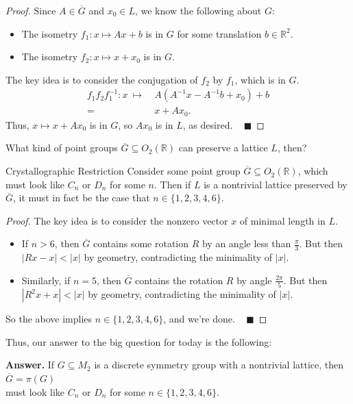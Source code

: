 \begin{proof}
    Since $A \in \overline{G}$ and $x_0 \in L$, we know the following about $G$:
    \begin{itemize}
        \item The isometry $f_1: x \mapsto Ax + b$ is in $G$ for some translation $b \in \mathbb{R}^2$.
        \item The isometry $f_2: x \mapsto x + x_0$ is in $G$.
    \end{itemize}
    The key idea is to consider the conjugation of $f_2$ by $f_1$, which is in $G$.
    \begin{align*} f_1f_2f_1^{-1}: x \ \mapsto \ & A(A^{-1}x - A^{-1}b + x_0) + b \\
    = \ & x + Ax_0. \end{align*}
    Thus, $x \mapsto x + Ax_0$ is in $G$, so $Ax_0$ is in $L$, as desired. ~ $\blacksquare$
\end{proof}

What kind of point groups $\overline{G} \subseteq O_2(\mathbb{R})$ can preserve a lattice $L$, then?

\begin{theorem}{Crystallographic Restriction}
    Consider some point group $\overline{G} \subseteq O_2(\mathbb{R})$, which must look like $C_n$ or $D_n$ for some $n$.  Then if $L$ is a nontrivial lattice preserved by $\overline{G}$, it must in fact be the case that $n \in \{1, 2, 3, 4, 6\}$.
\end{theorem}

\begin{proof}
    The key idea is to consider the nonzero vector $x$ of minimal length in $L$.
\begin{itemize}
    \item If $n > 6$, then $\overline{G}$ contains some rotation $R$ by an angle less than $\frac{\pi}{3}$.  But then $|Rx - x| < |x|$ by geometry, contradicting the minimality of $|x|$.
    \item Similarly, if $n = 5$, then $\overline{G}$ contains the rotation $R$ by angle $\frac{2\pi}{5}$.  But then $|R^2x + x| < |x|$ by geometry, contradicting the minimality of $|x|$.
\end{itemize}
    So the above implies $n \in \{1, 2, 3, 4, 6\}$, and we're done. ~ $\blacksquare$
\end{proof}

Thus, our answer to the big question for today is the following:

\begin{boxed-text}[42em]
\textbf{Answer.} If $G \subseteq M_2$ is a discrete symmetry group with a nontrivial lattice, then $\overline{G} = \pi(G)$ \\ must look like $C_n$ or $D_n$
for some $n \in \{1, 2, 3, 4, 6\}$.
\end{boxed-text}

